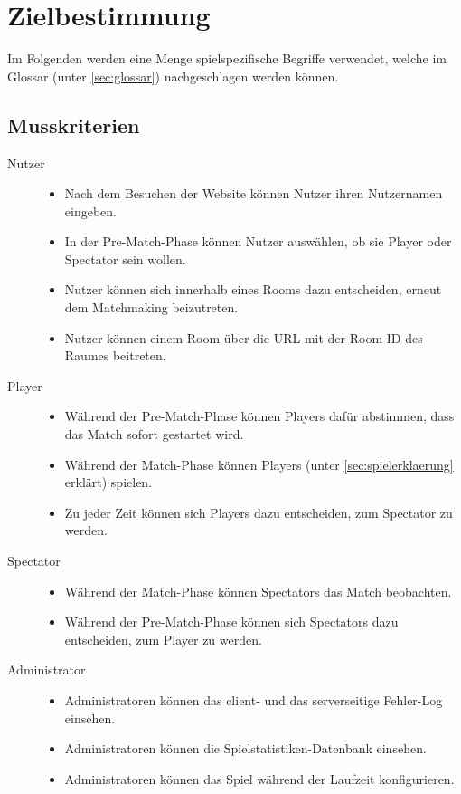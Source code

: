 \section{Zielbestimmung}

\newcommand{\crit}[2]{
	\item[#1] \hfill
		\begin{itemize}
			#2
		\end{itemize}
}

Im Folgenden werden eine Menge spielspezifische Begriffe verwendet, welche im Glossar (unter \ref{sec:glossar}) nachgeschlagen werden können.

\subsection{Musskriterien}
\begin{description}
	\crit{Nutzer}{
		\item Nach dem Besuchen der Website können Nutzer ihren Nutzernamen eingeben.
		\item In der Pre-Match-Phase können Nutzer auswählen, ob sie Player oder Spectator sein wollen.
		\item Nutzer können sich innerhalb eines Rooms dazu entscheiden, erneut dem Matchmaking beizutreten.
		\item Nutzer können einem Room über die URL mit der Room-ID des Raumes beitreten.
	}
	\crit{Player}{
		\item Während der Pre-Match-Phase können Players dafür abstimmen, dass das Match sofort gestartet wird.
		\item Während der Match-Phase können Players \vires (unter \ref{sec:spielerklaerung} erklärt) spielen.
		\item Zu jeder Zeit können sich Players dazu entscheiden, zum Spectator zu werden.
	}
	\crit{Spectator}{
		\item Während der Match-Phase können Spectators das Match beobachten.
		\item Während der Pre-Match-Phase können sich Spectators dazu entscheiden, zum Player zu werden.
	}
	\crit{Administrator}{
		\item Administratoren können das client- und das serverseitige Fehler-Log einsehen.
		\item Administratoren können die Spielstatistiken-Datenbank einsehen.
		\item Administratoren können das Spiel während der Laufzeit konfigurieren.
	}
\end{description}